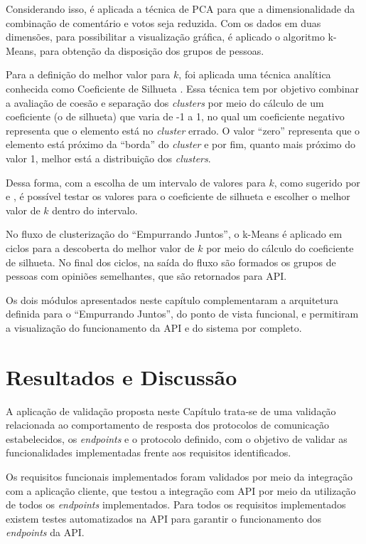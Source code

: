     Considerando isso, é aplicada a técnica de PCA para que
    a dimensionalidade da combinação de comentário e votos seja reduzida. 
    Com os dados em duas dimensões, para possibilitar a visualização gráfica, 
    é aplicado o algoritmo k-Means, para obtenção da disposição dos grupos de pessoas. 
    
    Para a definição do melhor valor para $k$, foi aplicada uma técnica analítica conhecida como Coeficiente de Silhueta \cite{tan2013data}.  
    Essa técnica tem por objetivo combinar a avaliação de coesão e separação dos \textit{clusters} por meio do cálculo de um coeficiente (o de silhueta) que 
    varia de -1 a 1, no qual um coeficiente negativo representa que o elemento está no \textit{cluster} errado.
    O valor ``zero'' representa que o elemento está próximo da ``borda'' do \textit{cluster} e por fim, quanto mais próximo do valor 1, melhor
    está a distribuição dos \textit{clusters}.

    Dessa forma, com a escolha de um intervalo de valores para $k$, como sugerido por  e , é possível testar os valores 
    para o coeficiente de silhueta e escolher o melhor valor de $k$ dentro do intervalo. 

    No fluxo de clusterização do ``Empurrando Juntos'', o k-Means é aplicado em ciclos para a descoberta do melhor valor de 
    $k$ por meio do cálculo do coeficiente de silhueta.
    No final dos ciclos, na saída do fluxo são formados os grupos de pessoas com opiniões semelhantes, que são retornados para API.
 
    Os dois módulos apresentados neste capítulo complementaram a arquitetura definida para o ``Empurrando Juntos'',
    do ponto de vista funcional, e permitiram a visualização do funcionamento da API e do sistema por completo.
    
    \section{Resultados e Discussão}
    
    A aplicação de validação proposta neste Capítulo trata-se de uma validação relacionada ao comportamento de resposta
    dos protocolos de comunicação estabelecidos, os \textit{endpoints}
    e o protocolo definido, com o objetivo de validar as funcionalidades implementadas frente aos requisitos identificados.
    
    Os requisitos funcionais implementados foram validados por meio da integração com a aplicação cliente,
    que testou a integração com API por meio da utilização de todos os \textit{endpoints} implementados.
    Para todos os requisitos implementados existem testes automatizados na API para garantir o funcionamento dos \textit{endpoints} da API.
    
